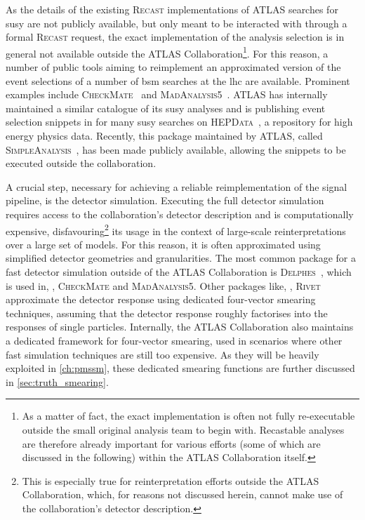 As the details of the existing \textsc{Recast} implementations of ATLAS searches for \gls{susy} are not publicly available, but only meant to be interacted with through a formal \textsc{Recast} request, the exact implementation of the analysis selection is in general not available outside the ATLAS Collaboration\footnote{As a matter of fact, the exact implementation is often not fully re-executable outside the small original analysis team to begin with. Recastable analyses are therefore already important for various efforts (some of which are discussed in the following) within the ATLAS Collaboration itself.}. 
For this reason, a number of public tools aiming to reimplement an approximated version of the event selections of a number of \gls{bsm} searches at the \gls{lhc} are available.
Prominent examples include \textsc{CheckMate}~\cite{Checkmate2:2016npn,Checkmate:2013wra} and \textsc{MadAnalysis5}~\cite{MadAnalysis:2012fm}.
ATLAS has internally maintained a similar catalogue of its \gls{susy} analyses and is publishing event selection snippets in \Cpp for many \gls{susy} searches on \textsc{HEPData}~\cite{HEPData:2017ypu}, a repository for high energy physics data.
Recently, this package maintained by ATLAS, called \textsc{SimpleAnalysis}~\cite{simpleanalysis}, has been made publicly available, allowing the \Cpp snippets to be executed outside the collaboration.

A crucial step, necessary for achieving a reliable reimplementation of the signal pipeline, is the detector simulation.
Executing the full detector simulation requires access to the collaboration's detector description and is computationally expensive, disfavouring\footnote{This is especially true for reinterpretation efforts outside the ATLAS Collaboration, which, for reasons not discussed herein, cannot make use of the collaboration's detector description.} its usage in the context of large-scale reinterpretations over a large set of models.
For this reason, it is often approximated using simplified detector geometries and granularities.
The most common package for a fast detector simulation outside of the ATLAS Collaboration is \textsc{Delphes}~\cite{Delphes:2009tx}, which is used in, \eg, \textsc{CheckMate} and \textsc{MadAnalysis5}.
Other packages like, \eg, \textsc{Rivet}~\cite{Rivet1:2010ar,Rivet2:2019stt} approximate the detector response using dedicated four-vector smearing techniques, assuming that the detector response roughly factorises into the responses of single particles.
Internally, the ATLAS Collaboration also maintains a dedicated framework for four-vector smearing, used in scenarios where other fast simulation techniques are still too expensive.
As they will be heavily exploited in \cref{ch:pmssm}, these dedicated smearing functions are further discussed in \cref{sec:truth_smearing}.

